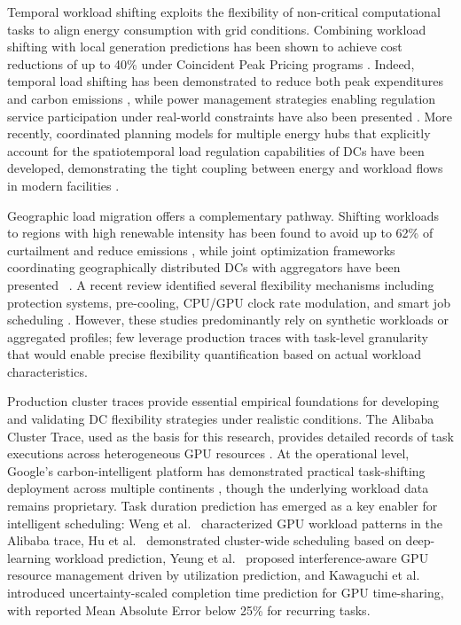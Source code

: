 \documentclass[preprint,12pt]{elsarticle}
\begin{document}
Temporal workload shifting exploits the flexibility of non-critical computational tasks to align energy consumption with grid conditions. Combining workload shifting with local generation predictions has been shown to achieve cost reductions of up to 40\% under Coincident Peak Pricing programs \cite{Liu2013}. Indeed, temporal load shifting has been demonstrated to reduce both peak expenditures and carbon emissions \cite{Zhang2023_TSC}, while power management strategies enabling regulation service participation under real-world constraints have also been presented \cite{Zhang2021_DATE}. More recently, coordinated planning models for multiple energy hubs that explicitly account for the spatiotemporal load regulation capabilities of DCs have been developed, demonstrating the tight coupling between energy and workload flows in modern facilities \cite{Zhang2024_TPWRS}.

Geographic load migration offers a complementary pathway. Shifting workloads to regions with high renewable intensity has been found to avoid up to 62\% of curtailment and reduce emissions \cite{Zheng2020}, while joint optimization frameworks coordinating geographically distributed DCs with aggregators have been presented ~\cite{ZHANG2024DR}. A recent review identified several flexibility mechanisms including protection systems, pre-cooling, CPU/GPU clock rate modulation, and smart job scheduling \cite{Crozier2025}. However, these studies predominantly rely on synthetic workloads or aggregated profiles; few leverage production traces with task-level granularity that would enable precise flexibility quantification based on actual workload characteristics.

Production cluster traces provide essential empirical foundations for developing and validating DC flexibility strategies under realistic conditions. The Alibaba Cluster Trace, used as the basis for this research, provides detailed records of task executions across heterogeneous GPU resources \cite{AlibabaTrace2021, Weng2022}. At the operational level, Google's carbon-intelligent platform has demonstrated practical task-shifting deployment across multiple continents \cite{Radovanovic2023}, though the underlying workload data remains proprietary. Task duration prediction has emerged as a key enabler for intelligent scheduling: Weng et al.\ \cite{Weng2022} characterized GPU workload patterns in the Alibaba trace, Hu et al.\ \cite{Hu2021} demonstrated cluster-wide scheduling based on deep-learning workload prediction, Yeung et al.\ \cite{Yeung2022} proposed interference-aware GPU resource management driven by utilization prediction, and Kawaguchi et al.\ \cite{Kawaguchi2024} introduced uncertainty-scaled completion time prediction for GPU time-sharing, with reported Mean Absolute Error below 25\% for recurring tasks.
\end{document}
